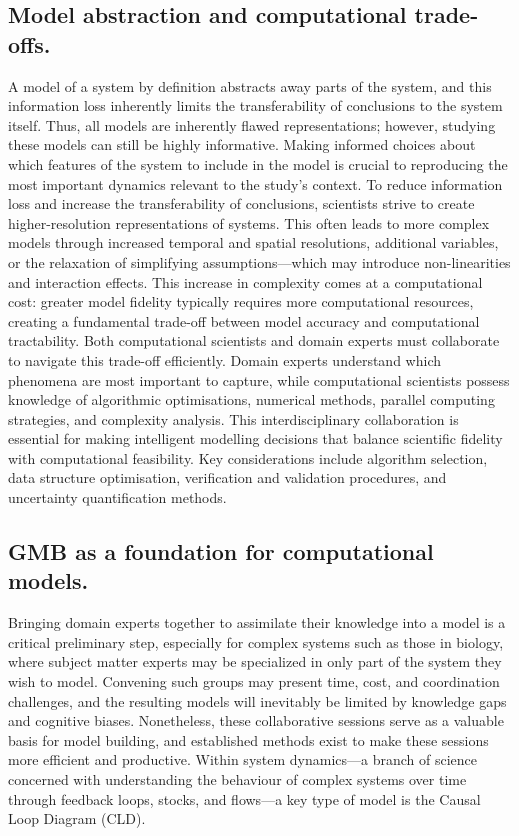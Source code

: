 \subsection{Model abstraction and computational trade-offs.}
A model of a system by definition abstracts away parts of the system, and this information loss inherently limits the transferability of conclusions to the system itself. Thus, all models are inherently flawed representations; however, studying these models can still be highly informative. Making informed choices about which features of the system to include in the model is crucial to reproducing the most important dynamics relevant to the study's context.
To reduce information loss and increase the transferability of conclusions, scientists strive to create higher-resolution representations of systems. This often leads to more complex models through increased temporal and spatial resolutions, additional variables, or the relaxation of simplifying assumptions—which may introduce non-linearities and interaction effects. This increase in complexity comes at a computational cost: greater model fidelity typically requires more computational resources, creating a fundamental trade-off between model accuracy and computational tractability.
Both computational scientists and domain experts must collaborate to navigate this trade-off efficiently. Domain experts understand which phenomena are most important to capture, while computational scientists possess knowledge of algorithmic optimisations, numerical methods, parallel computing strategies, and complexity analysis. This interdisciplinary collaboration is essential for making intelligent modelling decisions that balance scientific fidelity with computational feasibility. Key considerations include algorithm selection, data structure optimisation, verification and validation procedures, and uncertainty quantification methods.

\subsection{GMB as a foundation for computational models.}
Bringing domain experts together to assimilate their knowledge into a model is a critical preliminary step, especially for complex systems such as those in biology, where subject matter experts may be specialized in only part of the system they wish to model. Convening such groups may present time, cost, and coordination challenges, and the resulting models will inevitably be limited by knowledge gaps and cognitive biases. Nonetheless, these collaborative sessions serve as a valuable basis for model building, and established methods exist to make these sessions more efficient and productive.
Within system dynamics—a branch of science concerned with understanding the behaviour of complex systems over time through feedback loops, stocks, and flows—a key type of model is the Causal Loop Diagram (CLD).

